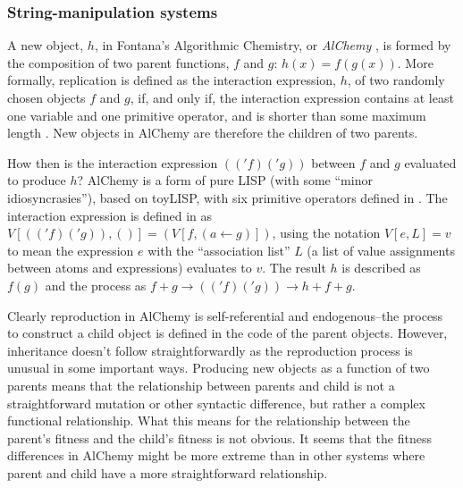 \subsubsection{String-manipulation systems}

A new object, $h$, in Fontana's Algorithmic Chemistry, or \emph{AlChemy} \parencite{Fontana1992}, is formed by the composition of two parent functions, $f$ and $g$: $h(x)=f(g(x))$. More formally, replication is defined as the interaction expression, $h$, of two randomly chosen objects $f$ and $g$, if, and only if, the interaction expression contains at least one variable and one primitive operator, and is shorter than some maximum length \parencite[p.173--p.180]{Fontana1992}. New objects in AlChemy are therefore the children of two parents.

How then is the interaction expression $(('f)('g))$ between $f$ and $g$ evaluated to produce $h$? AlChemy is a form of pure LISP (with some ``minor idiosyncrasies''), based on toyLISP, with six primitive operators defined in \textcite[p.205]{Fontana1992}. The interaction expression is defined in \textcite[definition A.9, p.204]{Fontana1992} as $V[(('f)('g)),()] = (V[f,(a\leftarrow g)])$, using the notation $V[e,L]=v$ to mean the expression $e$ with the ``association list'' $L$ (a list of value assignments between atoms and expressions) evaluates to $v$. The result $h$ is described as $f(g)$ and the process as $f+g \rightarrow (('f)('g)) \rightarrow h + f + g$.

Clearly reproduction in AlChemy is self-referential and endogenous--the process to construct a child object is defined in the code of the parent objects. However, inheritance doesn't follow straightforwardly as the reproduction process is unusual in some important ways. Producing new objects as a function of two parents means that the relationship between parents and child is not a straightforward mutation or other syntactic difference, but rather a complex functional relationship. What this means for the relationship between the parent's fitness and the child's fitness is not obvious. It seems that the fitness differences in AlChemy might be more extreme than in other systems where parent and child have a more straightforward relationship.

